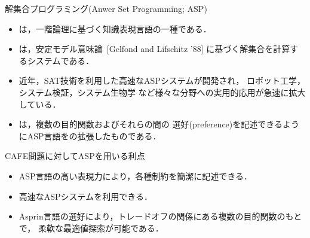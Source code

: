 \documentclass[dvipdfmx, 11pt]{beamer}
\begin{document}
\begin{frame}{解集合プログラミング(Anwer Set Programming; ASP)}
 \begin{itemize}
 \item {}は，一階論理に基づく知識表現言語の一種である．
 \item {}は，安定モデル意味論~[Gelfond and Lifschitz '88]
   に基づく解集合を計算するシステムである．
 \item 近年，SAT技術を利用した高速なASPシステムが開発され，
   ロボット工学，システム検証，システム生物学
   など様々な分野への実用的応用が急速に拡大している．
  \item {}は，複数の目的関数およびそれらの間の
	選好(preference)を記述できるようにASP言語をの拡張したものである．
 \end{itemize}
\vfill
 \begin{alertblock}{CAFE問題に対してASPを用いる利点}
   \begin{itemize} 
    \item ASP言語の高い表現力により，各種制約を簡潔に記述できる．
    \item 高速なASPシステムを利用できる．
    \item Asprin言語の選好により，トレードオフの関係にある複数の目的関数のもとで，
	  柔軟な最適値探索が可能である．
   \end{itemize}
 \end{alertblock}
\end{frame}
\end{document}
